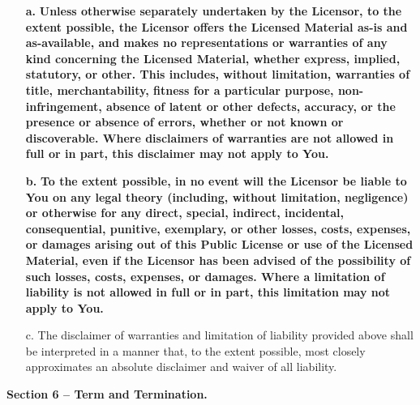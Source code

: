 \begin{itemize}
    \item[\textbf{a.}] \textbf{Unless otherwise separately undertaken by the Licensor, to the extent possible, the Licensor offers the Licensed Material as-is and as-available, and makes no representations or warranties of any kind concerning the Licensed Material, whether express, implied, statutory, or other. This includes, without limitation, warranties of title, merchantability, fitness for a particular purpose, non-infringement, absence of latent or other defects, accuracy, or the presence or absence of errors, whether or not known or discoverable. Where disclaimers of warranties are not allowed in full or in part, this disclaimer may not apply to You.}
    \item[\textbf{b.}] \textbf{To the extent possible, in no event will the Licensor be liable to You on any legal theory (including, without limitation, negligence) or otherwise for any direct, special, indirect, incidental, consequential, punitive, exemplary, or other losses, costs, expenses, or damages arising out of this Public License or use of the Licensed Material, even if the Licensor has been advised of the possibility of such losses, costs, expenses, or damages. Where a limitation of liability is not allowed in full or in part, this limitation may not apply to You.}
    \item[c.] The disclaimer of warranties and limitation of liability provided above shall be interpreted in a manner that, to the extent possible, most closely approximates an absolute disclaimer and waiver of all liability.
\end{itemize}

\begin{center}
    \textbf{Section 6 -- Term and Termination.}
\end{center}

